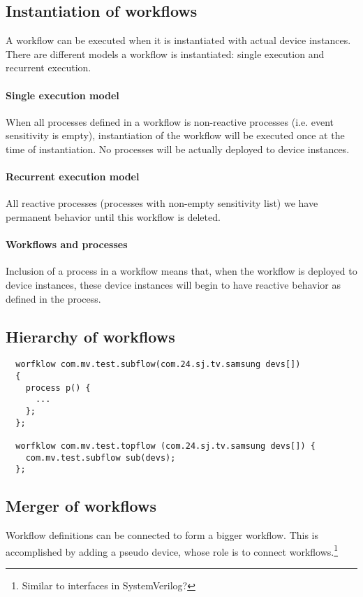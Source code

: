 \documentclass{note}
\begin{document}
\subsection{Instantiation of workflows}
A workflow can be executed when it is instantiated with actual device
instances. There are different models a workflow is instantiated: single
execution and recurrent execution. 

\paragraph{Single execution model}
When all processes defined in a workflow is non-reactive processes (i.e. event
sensitivity is empty), instantiation of the workflow will be executed once at
the time of instantiation. No processes will be actually deployed to device
instances. 

\paragraph{Recurrent execution model}
All reactive processes (processes with non-empty sensitivity list) we have
permanent behavior until this workflow is deleted.


\paragraph{Workflows and processes}
Inclusion of a process in a workflow means that, when the workflow is
deployed to device instances, these device instances will begin to have 
reactive behavior as defined in the process.

\subsection{Hierarchy of workflows}
\begin{verbatim}
  worfklow com.mv.test.subflow(com.24.sj.tv.samsung devs[])
  {
    process p() {
      ...
    };
  };

  worfklow com.mv.test.topflow (com.24.sj.tv.samsung devs[]) {
    com.mv.test.subflow sub(devs);
  };
\end{verbatim}

\subsection{Merger of workflows}
Workflow definitions can be connected to form a bigger workflow.
This is accomplished by adding a pseudo device, whose role is to connect
workflows.\footnote{Similar to interfaces in SystemVerilog?} 
\end{document}
